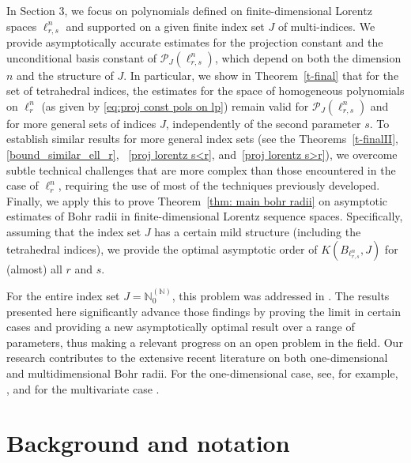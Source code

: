 \documentclass[12pt]{amsart}
\numberwithin{subsection}{section}
\theoremstyle{definition}
\theoremstyle{remark}
\def\N{\mathbb{ N}}
\begin{document}
In Section 3, we focus on polynomials defined on finite-dimensional Lorentz spaces $\ell_{r,s}^n$ and supported on a given finite index
set $J$ of multi-indices. We provide asymptotically accurate estimates for the projection constant and the unconditional basis constant
of $\mathcal{P}_J(\ell_{r,s}^n)$, which depend on both the dimension $n$ and the structure of $J$. In particular, we show in
Theorem~\ref{t-final} that for the set of tetrahedral indices, the estimates for the space of homogeneous polynomials on $\ell_r^n$
(as given by \eqref{eq:proj const pols on lp}) remain valid for $\mathcal{P}_J(\ell_{r,s}^n)$ and for more general sets of indices $J$,
independently of the second parameter $s$. To establish similar  results for more general index sets (see the Theorems~\ref{t-finalII}, \ref{bound_similar_ell_r}, ~\ref{proj lorentz s<r}, and~\ref{proj lorentz s>r}), we overcome subtle technical challenges that are more
complex than those encountered in the case of $\ell_r^n$, requiring the use of most of the techniques previously developed. Finally, we
apply this to prove Theorem~\ref{thm: main bohr radii} on asymptotic estimates of Bohr radii in finite-dimensional Lorentz sequence spaces.
Specifically, assuming that the index set \( J \) has a certain mild structure (including the tetrahedral indices), we provide the optimal
asymptotic order of $K(B_{\ell_{r,s}^n}, J)$ for (almost) all $r$ and $s$.

For the entire index set $J = \N_{0}^{(\N)}$, this problem was addressed in \cite[Corollary 10]{defant2018bohr}. The results presented here
significantly advance those findings by proving the limit in certain cases and providing a new asymptotically optimal result over a range
of parameters, thus making a relevant progress on an open problem in the field. Our research contributes to the extensive recent literature
on both one-dimensional and multidimensional Bohr radii. For the one-dimensional case, see, for example, \cite{alkhaleefah2019bohr,
beneteau2004remarks,
bhowmik2018bohr,
bombieri2004remark,
ismagilov2020sharp,
kayumov2017bohr,
kayumov2018bohr,
paulsen2002bohr,
paulsen2004bohr}, and for the multivariate case
\cite{
bayart2012maximum,
bayart2014bohr,
boas2000majorant,
defant2011bohr,
defant2011bohnenblust,
defant2003bohr,
defant2018bohr,
khavinson1997bohr}.

\section{Background and notation}
\end{document}
